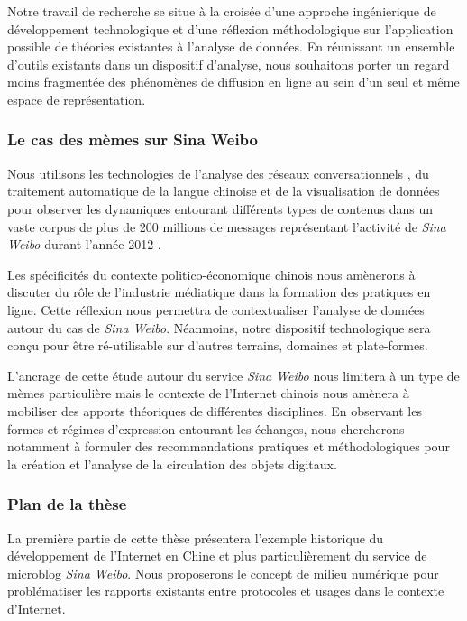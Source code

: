 Notre travail de recherche se situe à la croisée d'une approche ingénierique de développement technologique et d'une réflexion méthodologique sur l'application possible de théories existantes à l'analyse de données. En réunissant un ensemble d'outils existants dans un dispositif d'analyse, nous souhaitons porter un regard moins fragmentée des phénomènes de diffusion en ligne au sein d'un seul et même espace de représentation.

\subsubsection{Le cas des mèmes sur Sina Weibo}

Nous utilisons les technologies de l'analyse des réseaux conversationnels \citep{Weng2012}, du traitement automatique de la langue chinoise et de la visualisation de données pour observer les dynamiques entourant différents types de contenus dans un vaste corpus de plus de 200 millions de messages représentant l'activité de \textit{Sina Weibo} durant l'année 2012 \citep{Fu2013}. 

Les spécificités du contexte politico-économique chinois nous amènerons à discuter du rôle de l'industrie médiatique dans la formation des pratiques en ligne. Cette réflexion nous permettra de contextualiser l'analyse de données autour du cas de \textit{Sina Weibo}. Néanmoins, notre dispositif technologique sera conçu pour être ré-utilisable sur d'autres terrains, domaines et plate-formes. 

L'ancrage de cette étude autour du service \textit{Sina Weibo} nous limitera à un type de mèmes particulière mais le contexte de l'Internet chinois nous amènera à mobiliser des apports théoriques de différentes disciplines. En observant les formes et régimes d'expression entourant les échanges, nous chercherons notamment à formuler des recommandations pratiques et méthodologiques pour la création et l'analyse de la circulation des objets digitaux. 

\subsubsection{Plan de la thèse}


La première partie de cette thèse présentera l'exemple historique du développement de l'Internet en Chine et plus particulièrement du service de microblog \textit{Sina Weibo}. Nous proposerons le concept de {milieu numérique} pour problématiser les rapports existants entre protocoles et usages dans le contexte d'Internet.

